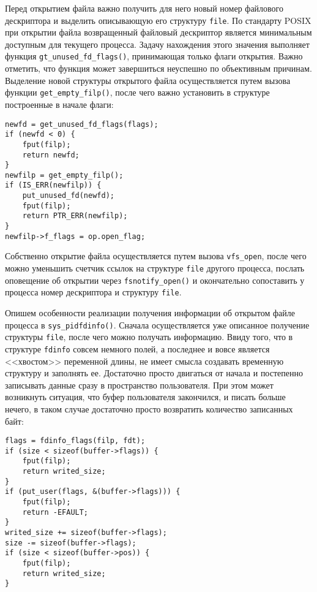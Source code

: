 Перед открытием файла важно получить для него новый номер файлового дескриптора
и выделить описывающую его структуру \texttt{file}. По стандарту POSIX при
открытии файла возвращенный файловый дескриптор является минимальным доступным
для текущего процесса. Задачу нахождения этого значения выполняет функция
\texttt{gt\_unused\_fd\_flags()}, принимающая только флаги открытия. Важно
отметить, что функция может завершиться неуспешно по объективным причинам.
Выделение новой структуры открытого файла осуществляется путем вызова функции
\texttt{get\_empty\_filp()}, после чего важно установить в структуре построенные
в начале флаги:
\medskip
\begin{lstlisting}[style=cstyle]
newfd = get_unused_fd_flags(flags);
if (newfd < 0) {
	fput(filp);
	return newfd;
}
newfilp = get_empty_filp();
if (IS_ERR(newfilp)) {
	put_unused_fd(newfd);
	fput(filp);
	return PTR_ERR(newfilp);
}
newfilp->f_flags = op.open_flag;
\end{lstlisting}
\medskip

Собственно открытие файла осуществляется путем вызова \texttt{vfs\_open}, после
чего можно уменьшить счетчик ссылок на структуре \texttt{file} другого процесса,
послать оповещение об открытии через \texttt{fsnotify\_open()} и окончательно
сопоставить у процесса номер дескриптора и структуру \texttt{file}.

Опишем особенности реализации получения информации об открытом файле процесса в
\texttt{sys\_pidfdinfo()}. Сначала осуществляется уже описанное получение
структуры \texttt{file}, после чего можно получать информацию. Ввиду того, что в
структуре \texttt{fdinfo} совсем немного полей, а последнее и вовсе является
<<хвостом>> переменной длины, не имеет смысла создавать временную структуру и
заполнять ее. Достаточно просто двигаться от начала и постепенно записывать
данные сразу в пространство пользователя. При этом может возникнуть ситуация,
что буфер пользователя закончился, и писать больше нечего, в таком случае
достаточно просто возвратить количество записанных байт:
\medskip
\begin{lstlisting}[style=cstyle]
flags = fdinfo_flags(filp, fdt);
if (size < sizeof(buffer->flags)) {
	fput(filp);
	return writed_size;
}
if (put_user(flags, &(buffer->flags))) {
	fput(filp);
	return -EFAULT;
}
writed_size += sizeof(buffer->flags);
size -= sizeof(buffer->flags);
if (size < sizeof(buffer->pos)) {
	fput(filp);
	return writed_size;
}
\end{lstlisting}
\medskip

